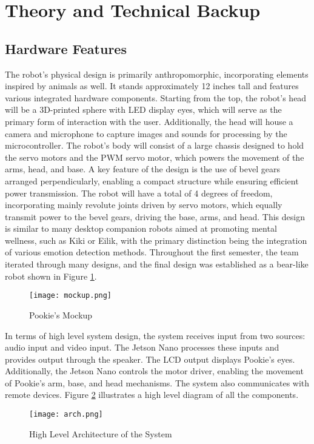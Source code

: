 \section{Theory and Technical Backup}
\subsection{Hardware Features}
The robot's physical design is primarily anthropomorphic, incorporating elements inspired by animals as well. It stands approximately 12 inches tall and features various integrated hardware components. Starting from the top, the robot’s head will be a 3D-printed sphere with LED display eyes, which will serve as the primary form of interaction with the user. Additionally, the head will house a camera and microphone to capture images and sounds for processing by the microcontroller.
The robot’s body will consist of a large chassis designed to hold the servo motors and the PWM servo motor, which powers the movement of the arms, head, and base. A key feature of the design is the use of bevel gears arranged perpendicularly, enabling a compact structure while ensuring efficient power transmission. The robot will have a total of 4 degrees of freedom, incorporating mainly revolute joints driven by servo motors, which equally transmit power to the bevel gears, driving the base, arms, and head.
This design is similar to many desktop companion robots aimed at promoting mental wellness, such as Kiki or Eilik, with the primary distinction being the integration of various emotion detection methods. Throughout the first semester, the team iterated through many designs, and the final design was established as a bear-like robot shown in Figure \ref{fig:mockup}. 

\begin{figure}[ht]
    \centering
    \texttt{[image: mockup.png]}
    \caption{Pookie’s Mockup}
    \label{fig:mockup}
\end{figure}

In terms of high level system design, the system receives input from two sources: audio input and video input. The Jetson Nano processes these inputs and provides output through the speaker. The LCD output displays Pookie’s eyes. Additionally, the Jetson Nano controls the motor driver, enabling the movement of Pookie’s arm, base, and head mechanisms. The system also communicates with remote devices. Figure \ref{fig:arch} illustrates a high level diagram of all the components.

\begin{figure}[ht]
    \centering
    \texttt{[image: arch.png]}
    \caption{High Level Architecture of the System}
    \label{fig:arch}
\end{figure}

